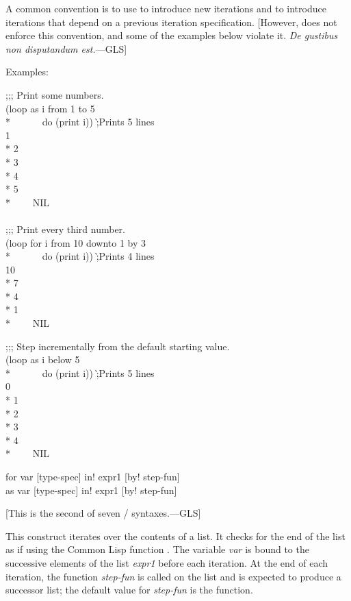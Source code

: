 \begin{new}
\begin{defloop}
A common convention is to use  to introduce new iterations and 
to introduce iterations that depend on a previous iteration specification.
[However,  does not enforce this convention, and some of the examples
below violate it.  {\it De gustibus non disputandum est.}---GLS]

Examples:
\begin{lisp}
;;; Print some numbers. \\[3pt]
(loop as i from 1 to 5 \\*
~~~~~~do (print i)) \`;{\rm Prints 5 lines} \\
1 \\*
2 \\*
3 \\*
4 \\*
5 \\*
~~~\EV~NIL \\
 \\
;;; Print every third number. \\[3pt]
(loop for i from 10 downto 1 by 3 \\*
~~~~~~do (print i)) \`;{\rm Prints 4 lines}\\
10  \\*
7  \\*
4  \\*
1  \\*
~~~\EV~NIL
\end{lisp}

\begin{lisp}
;;; Step incrementally from the default starting value. \\[3pt]
(loop as i below 5 \\*
~~~~~~do (print i)) \`;{\rm Prints 5 lines} \\
0 \\*
1 \\*
2 \\*
3 \\*
4 \\*
~~~\EV~NIL
\end{lisp}
\end{defloop}

\begin{defloop}
for var [type-spec] \!in! expr1 [\!by! step-fun] \\
as var [type-spec] \!in! expr1 [\!by! step-fun]

[This is the second of seven / syntaxes.---GLS]

This construct iterates over the contents of a list.  It checks for 
the end of the list as if using the Common Lisp function .  
The variable {\it var\/} is bound to the successive elements  of 
the list {\it expr1\/} before each
iteration.  At the end of each iteration, the function {\it step-fun\/}
is called on the list and is expected to produce a successor list;
the default value for {\it step-fun\/} is the  function.


\end{defloop}
\end{new}
